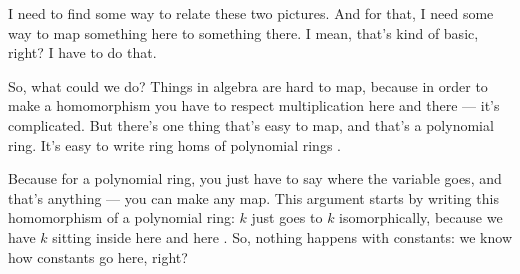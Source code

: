 \begin{proofWrapper}
\begin{content}
\begin{center}
\end{center}
\end{content}

\begin{hidden}
\end{hidden}

\begin{speech}[01:26:22 - 01:27:53]
I need to find some way to relate these two pictures. And for that, I need some way to map something here to something there. I mean, that's kind of basic, right? I have to do that.

So, what could we do? Things in algebra are hard to map, because in order to make a homomorphism you have to respect multiplication here and there --- it's complicated. But there's one thing that's easy to map, and that's a polynomial ring. It's easy to write ring homs of polynomial rings .

Because for a polynomial ring, you just have to say where the variable goes, and that's anything --- you can make any map. This argument starts by writing this homomorphism of a polynomial ring: $k$ just goes to $k$ isomorphically, because we have $k$ sitting inside here and here . So, nothing happens with constants: we know how constants go here, right?


\end{speech}
\end{proofWrapper}
